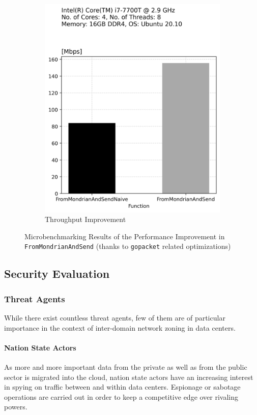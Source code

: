 \begin{figure}[t]
\begin{subfigure}[t]{.22\textwidth}
      \includegraphics[width=\linewidth]{img/from_mondrian_and_send_opt_throughput.png}
      \caption{Throughput Improvement}
      \label{fig:sub2: Throughput Improvement}
    \end{subfigure}
    \caption{Microbenchmarking Results of the Performance Improvement in \texttt{FromMondrianAndSend} (thanks to \texttt{gopacket} related optimizations)}
    \label{fig:Performance Improvement in FromMondrianAndSend}
\end{figure}

\subsection{Security Evaluation}\label{Security Evaluation}
\subsubsection{Threat Agents}\label{Threat Agents}
While there exist countless threat agents, few of them are of particular importance in the context of inter-domain network zoning in data centers.
\paragraph{Nation State Actors} As more and more important data from the private as well as from the public sector is migrated into the cloud, nation state actors have an increasing interest in spying on traffic between and within data centers. Espionage or sabotage operations are carried out in order to keep a competitive edge over rivaling powers.

